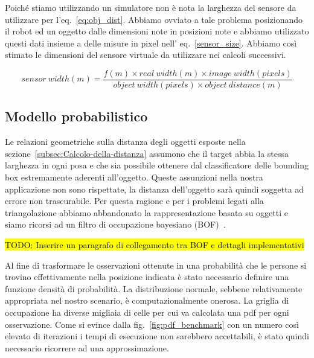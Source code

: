 \documentclass[a4paper]{article}
\begin{document}
	Poiché stiamo utilizzando un simulatore non è nota la larghezza del sensore
	da utilizzare per l'eq.~\ref{eq:obj_dist}. Abbiamo ovviato a tale problema
	posizionando il robot ed un oggetto dalle dimensioni note in posizioni note
	e abbiamo utilizzato questi dati insieme a delle misure in pixel nell'
	eq.~\ref{sensor_size}. Abbiamo così stimato le dimensioni del sensore
	virtuale da utilizzare nei calcoli successivi.

	\begin{equation}\label{sensor_size}
	sensor~width(m) = 
	\frac{f(m) \times real~width(m) \times image~width(pixels)}
	{object~width(pixels) \times object~distance(m)}
	\end{equation}
	
	\subsection{Modello probabilistico}\label{subsec:Modello-probabilistico}

	Le relazioni geometriche sulla distanza degli oggetti esposte nella
	sezione~\ref{subsec:Calcolo-della-distanza} assumono che il target abbia la
	stessa larghezza in ogni posa e che sia possibile ottenere dal
	classificatore delle bounding box estremamente aderenti all'oggetto. Queste
	assunzioni nella nostra applicazione non sono rispettate, la distanza
	dell'oggetto sarà quindi soggetta ad errore non trascurabile. Per questa
	ragione e per i problemi legati alla triangolazione abbiamo abbandonato la
	rappresentazione basata su oggetti e siamo ricorsi ad un filtro di
	occupazione bayesiano (BOF)~\cite{tay2008bayesian}.
		
	\hl{TODO: Inserire un paragrafo di collegamento tra BOF e dettagli implementativi}

	Al fine di trasformare le osservazioni ottenute in una probabilità che le
	persone si trovino effettivamente nella posizione indicata è stato
	necessario definire una funzione densità di probabilità. La distribuzione
	normale, sebbene relativamente appropriata nel nostro scenario, è
	computazionalmente onerosa. La griglia di occupazione ha diverse migliaia
	di celle per cui va calcolata una pdf per ogni osservazione. Come si evince
	dalla fig.~\ref{fig:pdf_benchmark} con un numero così elevato di iterazioni
	i tempi di esecuzione non sarebbero accettabili, è stato quindi necessario
	ricorrere ad una approssimazione.
	
\end{document}
